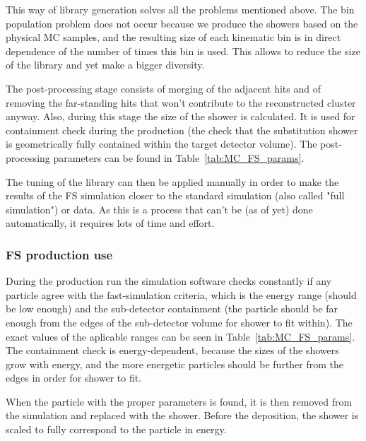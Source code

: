 This way of library generation solves all the problems mentioned above. The bin population problem does not occur because we produce the showers based on the physical MC samples, and the resulting size of each kinematic bin is in direct dependence of the number of times this bin is used. This allows to reduce the size of the library and yet make a bigger diversity.

The post-processing stage consists of merging of the adjacent hits and of removing the far-standing hits that won't contribute to the reconstructed cluster anyway. Also, during this stage the size of the shower is calculated. It is used for containment check during the production (the check that the substitution shower is geometrically fully contained within the target detector volume). The post-processing parameters can be found in Table~\ref{tab:MC_FS_params}.

The tuning of the library can then be applied manually in order to make the results of the FS simulation closer to the standard simulation (also called "full simulation") or data. As this is a process that can't be (as of yet) done automatically, it requires lots of time and effort.

\subsubsection{FS production use}
\label{sec:MC_FS_prod}

During the production run the simulation software checks constantly if any particle agree with the fast-simulation criteria, which is the energy range (should be low enough) and the sub-detector containment (the particle should be far enough from the edges of the sub-detector volume for shower to fit within). The exact values of the aplicable ranges can be seen in Table~\ref{tab:MC_FS_params}. The containment check is energy-dependent, because the sizes of the showers grow with energy, and the more energetic particles should be further from the edges in order for shower to fit.

When the particle with the proper parameters is found, it is then removed from the simulation and replaced with the shower. Before the deposition, the shower is scaled to fully correspond to the particle in energy.

